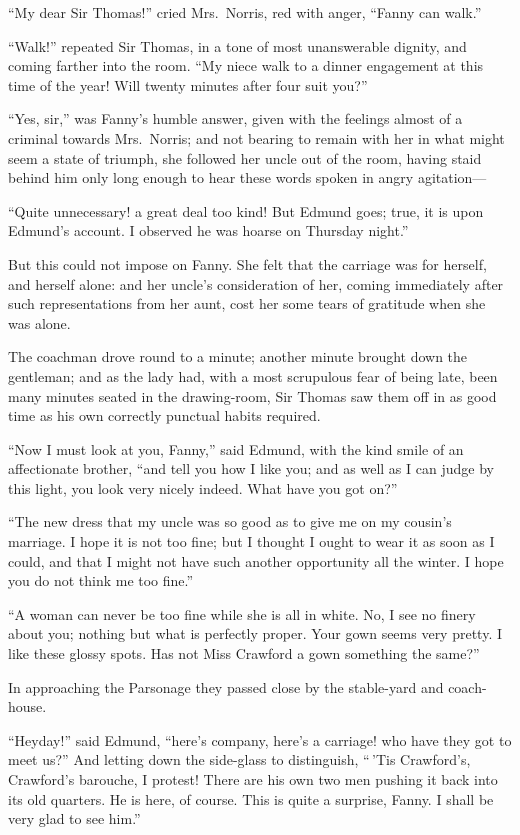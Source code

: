 ``My dear Sir Thomas!'' cried Mrs.\ Norris, red with anger,
``Fanny can walk.''

``Walk!'' repeated Sir Thomas, in a tone of most unanswerable
dignity, and coming farther into the room.  ``My niece
walk to a dinner engagement at this time of the year!
Will twenty minutes after four suit you?''

``Yes, sir,'' was Fanny's humble answer, given with the
feelings almost of a criminal towards Mrs.\ Norris;
and not bearing to remain with her in what might seem
a state of triumph, she followed her uncle out of the room,
having staid behind him only long enough to hear these
words spoken in angry agitation---%

``Quite unnecessary! a great deal too kind!
But Edmund goes; true, it is upon Edmund's account.
I observed he was hoarse on Thursday night.''

But this could not impose on Fanny.  She felt that
the carriage was for herself, and herself alone:
and her uncle's consideration of her, coming immediately
after such representations from her aunt, cost her
some tears of gratitude when she was alone.

The coachman drove round to a minute; another minute
brought down the gentleman; and as the lady had, with a
most scrupulous fear of being late, been many minutes
seated in the drawing-room, Sir Thomas saw them off
in as good time as his own correctly punctual habits required.

``Now I must look at you, Fanny,'' said Edmund, with the
kind smile of an affectionate brother, ``and tell you
how I like you; and as well as I can judge by this light,
you look very nicely indeed.  What have you got on?''

``The new dress that my uncle was so good as to give me
on my cousin's marriage.  I hope it is not too fine; but I
thought I ought to wear it as soon as I could, and that I
might not have such another opportunity all the winter.
I hope you do not think me too fine.''

``A woman can never be too fine while she is all in white.  No, I
see
no finery about you; nothing but what is perfectly proper.
Your gown seems very pretty.  I like these glossy spots.
Has not Miss Crawford a gown something the same?''

In approaching the Parsonage they passed close by the
stable-yard and coach-house.

``Heyday!'' said Edmund, ``here's company, here's a carriage!
who have they got to meet us?''  And letting down the side-glass
to distinguish, ``\,'Tis Crawford's, Crawford's barouche,
I protest!  There are his own two men pushing it back
into its old quarters.  He is here, of course.  This is
quite a surprise, Fanny.  I shall be very glad to see him.''

